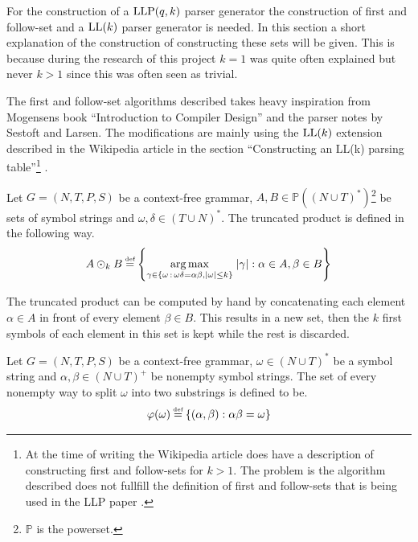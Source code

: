 For the construction of a $\text{LLP}(q,k)$ parser generator the construction of first and follow-set \cite[5]{Vagner2007} and a $\text{LL}(k)$ parser generator is needed. In this section a short explanation of the construction of constructing these sets will be given. This is because during the research of this project $k = 1$ was quite often explained but never $k > 1$ since this was often seen as trivial.

The first and follow-set algorithms described takes heavy inspiration from Mogensens book ``Introduction to Compiler Design'' \cite[55-65]{Mogensen} and the parser notes \cite[10-15]{notes:parser} by Sestoft and Larsen. The modifications are mainly using the $\text{LL}(k)$ extension described in the Wikipedia article in the section ``Constructing an LL(k) parsing table''\footnote{At the time of writing the Wikipedia article does have a description of constructing first and follow-sets for $k > 1$. The problem is the algorithm described does not fullfill the definition of first and follow-sets that is being used in the LLP paper \cite[5]{Vagner2007}.} \cite{wiki:LL_parser}.

\begin{definition}
    Let $G = (N, T, P, S)$ be a context-free grammar, $A, B \in \mathbb{P}((N \cup T)^*)$\footnote{$\mathbb{P}$ is the powerset.} be sets of symbol strings and $\omega, \delta \in (T \cup N)^*$. The truncated product is defined in the following way.
    \begin{gather*}
        A \odot_k B \defeq \left\{\underset{\gamma \in \{\omega \, : \, \omega\delta = \alpha\beta, |\omega| \leq k\}}{\arg \max} \; |\gamma| : \alpha \in A, \beta \in B\right\}
    \end{gather*}
\end{definition}
\noindent The truncated product can be computed by hand by concatenating each element $\alpha \in A$ in front of every element $\beta \in B$. This results in a new set, then the $k$ first symbols of each element in this set is kept while the rest is discarded. 

\begin{definition}
    Let $G = (N, T, P, S)$ be a context-free grammar, $\omega \in (N \cup T)^*$ be a symbol string and $\alpha, \beta \in (N \cup T)^+$ be nonempty symbol strings. The set of every nonempty way to split $\omega$ into two substrings is defined to be.
    \begin{gather*}
        \varphi(\omega) \defeq \{(\alpha, \beta) : \alpha\beta = \omega\}
    \end{gather*}
\end{definition}


